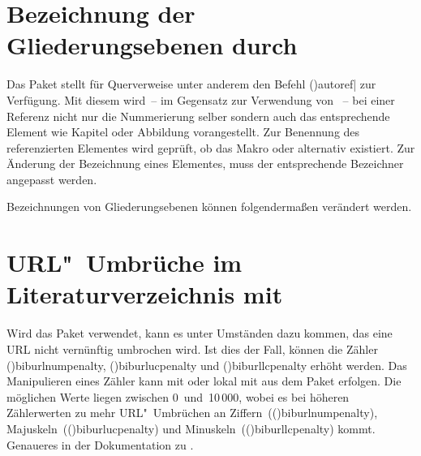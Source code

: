 \section{%
  Bezeichnung der Gliederungsebenen durch %
  \label{sec:tips:references}%
}

%
Das Paket  stellt für Querverweise unter anderem den Befehl 
\Macro(){autoref|} zur Verfügung. Mit diesem 
wird~-- im Gegensatz zur Verwendung von ~-- bei einer Referenz nicht 
nur die Nummerierung selber sondern auch das entsprechende Element wie Kapitel 
oder Abbildung vorangestellt. Zur Benennung des referenzierten Elementes wird 
geprüft, ob das Makro  oder alternativ 
 existiert. Zur Änderung der Bezeichnung eines 
Elementes, muss der entsprechende Bezeichner angepasst werden.
%
\begin{Example}
Bezeichnungen von Gliederungsebenen können folgendermaßen verändert werden.
\begin{Code}
\end{Code}
\end{Example}



\section{%
  URL"~Umbrüche im Literaturverzeichnis mit %
}

%
Wird das Paket  verwendet, kann es unter Umständen dazu 
kommen, das eine URL nicht vernünftig umbrochen wird. Ist dies der Fall, 
können die Zähler \Counter(){biburlnumpenalty}, 
\Counter(){biburlucpenalty} und 
\Counter(){biburllcpenalty} erhöht werden. Das Manipulieren 
eines Zähler kann mit  oder lokal mit 
 aus dem Paket  erfolgen. 
Die möglichen Werte liegen zwischen 0~und~10\,000, wobei es bei höheren 
Zählerwerten zu mehr URL"~Umbrüchen an 
Ziffern~(\Counter(){biburlnumpenalty}), 
Majuskeln~(\Counter(){biburlucpenalty}) und 
Minuskeln~(\Counter(){biburllcpenalty}) kommt. 
Genaueres in der Dokumentation zu .



